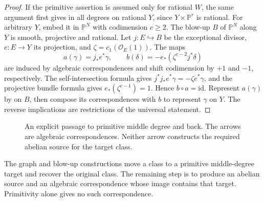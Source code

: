 \begin{proof}
If the primitive assertion is assumed only for rational \(W\), the
same argument first gives \Fiii{} in all degrees on rational \(Y\),
since \(Y\times\mathbb P^r\) is rational. For arbitrary \(Y\), embed it
in \(\mathbb P^N\) with codimension \(c\ge2\). The blow-up \(B\) of
\(\mathbb P^N\) along \(Y\) is smooth, projective and rational.
Let \(j\colon E\hookrightarrow B\) be the exceptional divisor,
\(e\colon E\to Y\) its projection, and
\(\zeta=c_1(\mathcal O_E(1))\). The maps
\[
 a(\gamma)=j_*e^*\gamma,\qquad
 b(\delta)=-e_*\!\left(\zeta^{c-2}j^*\delta\right)
\]
are induced by algebraic correspondences and shift codimension by
\(+1\) and \(-1\), respectively. The self-intersection formula gives
\(j^*j_*e^*\gamma=-\zeta e^*\gamma\), and the projective bundle formula
gives \(e_*(\zeta^{c-1})=1\). Hence \(b\circ a=\mathrm{id}\).
Represent \(a(\gamma)\) by \Fiii{} on \(B\), then compose its
correspondences with \(b\) to represent \(\gamma\) on \(Y\).
The reverse implications are restrictions of the universal statement.
\end{proof}

\begin{figure}[ht]
\centering
{}
\caption{An explicit passage to primitive middle degree and back.
The arrows are algebraic correspondences. Neither arrow constructs
the required abelian source for the target class.}
\label{fig:primitive-middle-target}
\end{figure}

The graph and blow-up constructions move a class to a primitive
middle-degree target and recover the original class. The remaining
step is to produce an abelian source and an algebraic correspondence
whose image contains that target. Primitivity alone gives no such
correspondence.
